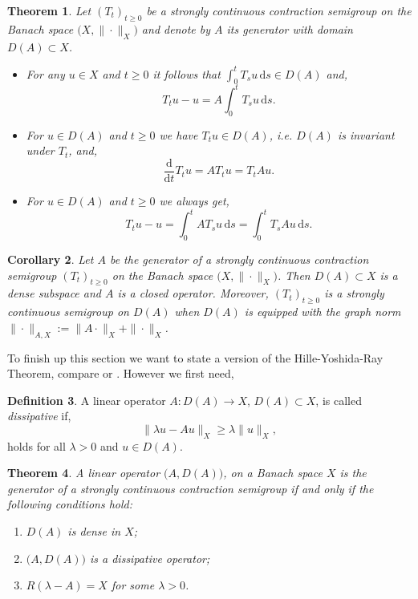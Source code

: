 \documentclass[a4paper, 12pt]{report}
\newtheorem{theorem}{Theorem}[section]
\newtheorem{cor}[theorem]{Corollary}
\theoremstyle{cor}
\theoremstyle{remark}
\theoremstyle{definition}
\newtheorem{defn}[theorem]{Definition}
\begin{document}
\begin{theorem}
Let $(T_t)_{t \ge 0}$ be a strongly continuous contraction semigroup on the Banach space $\big(X, \|\cdot\|_X\big)$ and denote by $A$ its generator with domain $D(A) \subset X$.
\begin{itemize}
\item[A.] For any $u \in X$ and $t \ge 0$ it follows that $\int_0^tT_su\,\mathrm{d}s \in D(A)$ and,
\begin{equation}
T_tu - u = A\int_0^tT_su\,\mathrm{d}s.
\end{equation}

\item[B.] For $u \in D(A)$ and $t \ge 0$ we have $T_tu \in D(A)$, i.e. $D(A)$ is invariant under $T_t$, and,
\begin{equation}
\frac{\mathrm{d}}{\mathrm{d}t}T_tu = AT_tu = T_tAu.
\end{equation}

\item[C.] For $u \in D(A)$ and $t \ge 0$ we always get,
\begin{equation}
T_tu - u = \int_0^tAT_su\,\mathrm{d}s = \int_0^tT_sAu\,\mathrm{d}s.
\end{equation}
\end{itemize}
\end{theorem}
\begin{cor}
Let $A$ be the generator of a strongly continuous contraction semigroup $(T_t)_{t \ge 0}$ on the Banach space $\big(X, \|\cdot\|_X\big)$.  Then $D(A) \subset X$ is a dense subspace and $A$ is a closed operator.  Moreover, $(T_t)_{t \ge 0}$ is a strongly continuous semigroup on $D(A)$ when $D(A)$ is equipped with the graph norm $\|\cdot\|_{A, X} := \|A\cdot\|_X + \|\cdot\|_X$.
\end{cor}

To finish up this section we want to state a version of the Hille-Yoshida-Ray Theorem, compare \cite{I.88} or \cite{Vol1}.  However we first need,
\begin{defn}
A linear operator $A : D(A) \to X$, $D(A) \subset X$, is called \emph{dissipative} if,
$$
\|\lambda u - Au\|_X \ge \lambda\|u\|_X,
$$
holds for all $\lambda > 0$ and $u \in D(A)$.
\end{defn}

\begin{theorem}
A linear operator $\big(A, D(A)\big)$, on a Banach space $X$ is the generator of a strongly continuous contraction semigroup if and only if the following conditions hold:
\begin{enumerate}
\item $D(A)$ is dense in $X$;

\item $\big(A, D(A)\big)$ is a dissipative operator;

\item $R(\lambda - A) = X$ for some $\lambda > 0$.
\end{enumerate}
\end{theorem}
\end{document}
